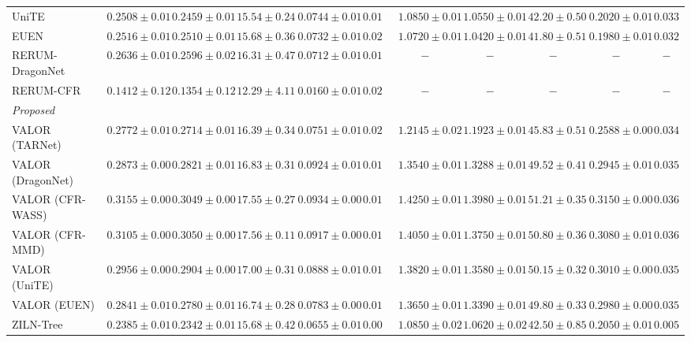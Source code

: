 \documentclass[runningheads]{llncs}
\begin{document}
\begin{table}[t]
{\begin{tabular}{lccccc|ccccc}
    UniTE & $0.2508 \pm 0.01$ & $0.2459 \pm 0.01$ & $15.54 \pm 0.24$ & $0.0744 \pm 0.01$ & $0.0197$ & $1.0850 \pm 0.01$ & $1.0550 \pm 0.01$ & $42.20 \pm 0.50$ & $0.2020 \pm 0.01$ & $0.0330$ \\
    EUEN & $0.2516 \pm 0.01$ & $0.2510 \pm 0.01$ & $15.68 \pm 0.36$ & $0.0732 \pm 0.01$ & $0.0201$ & $1.0720 \pm 0.01$ & $1.0420 \pm 0.01$ & $41.80 \pm 0.51$ & $0.1980 \pm 0.01$ & $0.0329$ \\
    RERUM-DragonNet & \underline{$0.2636 \pm 0.01$} & \underline{$0.2596 \pm 0.02$} & \underline{$16.31 \pm 0.47$} & $0.0712 \pm 0.01$ & $0.0195$ & $-$ & $-$ & $-$ & $-$ & $-$ \\
    RERUM-CFR & $0.1412 \pm 0.12$ & $0.1354 \pm 0.12$ & $12.29 \pm 4.11$ & $0.0160 \pm 0.01$ & $0.0205$ & $-$ & $-$ & $-$ & $-$ & $-$ \\
    \midrule
    \textit{Proposed} & & & & & & & & & & \\
    VALOR (TARNet) & $0.2772 \pm 0.01$ & $0.2714 \pm 0.01$ & $16.39 \pm 0.34$ & $0.0751 \pm 0.01$ & $0.0201$ & $1.2145 \pm 0.02$ & $1.1923 \pm 0.01$ & $45.83 \pm 0.51$ & $0.2588 \pm 0.00$ & $0.0346$ \\
    VALOR (DragonNet) & $0.2873 \pm 0.00$ & $0.2821 \pm 0.01$ & $16.83 \pm 0.31$ & $0.0924 \pm 0.01$ & $0.0197$ & $1.3540 \pm 0.01$ & $1.3288 \pm 0.01$ & $49.52 \pm 0.41$ & $0.2945 \pm 0.01$ & $0.0351$ \\
    VALOR (CFR-WASS) & \underline{$0.3155 \pm 0.00$} & $0.3049 \pm 0.00$ & $17.55 \pm 0.27$ & \underline{$0.0934 \pm 0.00$} & $0.0196$ & \underline{$1.4250 \pm 0.01$} & \underline{$1.3980 \pm 0.01$} & \underline{$51.21 \pm 0.35$} & \underline{$0.3150 \pm 0.00$} & $0.0365$ \\
    VALOR (CFR-MMD) & $0.3105 \pm 0.00$ & \underline{$0.3050 \pm 0.00$} & \underline{$17.56 \pm 0.11$} & $0.0917 \pm 0.00$ & $0.0199$ & $1.4050 \pm 0.01$ & $1.3750 \pm 0.01$ & $50.80 \pm 0.36$ & $0.3080 \pm 0.01$ & $0.0362$ \\
    VALOR (UniTE) & $0.2956 \pm 0.00$ & $0.2904 \pm 0.00$ & $17.00 \pm 0.31$ & $0.0888 \pm 0.01$ & $0.0198$ & $1.3820 \pm 0.01$ & $1.3580 \pm 0.01$ & $50.15 \pm 0.32$ & $0.3010 \pm 0.00$ & $0.0358$ \\
    VALOR (EUEN) & $0.2841 \pm 0.01$ & $0.2780 \pm 0.01$ & $16.74 \pm 0.28$ & $0.0783 \pm 0.00$ & $0.0187$ & $1.3650 \pm 0.01$ & $1.3390 \pm 0.01$ & $49.80 \pm 0.33$ & $0.2980 \pm 0.00$ & $0.0356$ \\
    ZILN-Tree & $0.2385 \pm 0.01$ & $0.2342 \pm 0.01$ & $15.68 \pm 0.42$ & $0.0655 \pm 0.01$ & \underline{$0.0042$} & $1.0850 \pm 0.02$ & $1.0620 \pm 0.02$ & $42.50 \pm 0.85$ & $0.2050 \pm 0.01$ & \underline{$0.0055$} \\
    \bottomrule
  \end{tabular}
  }
\end{table}
\end{document}
